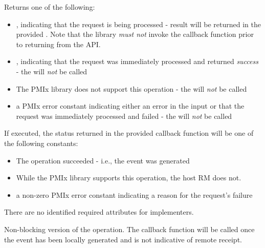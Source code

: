 \begin{arglist}
\end{arglist}

Returns one of the following:

\begin{itemize}
    \item {}, indicating that the request is being processed - result will be returned in the provided . Note that the library \emph{must not} invoke the callback function prior to returning from the \ac{API}.
    \item {}, indicating that the request was immediately processed and returned \textit{success} - the  will \textit{not} be called
    \item {} The \ac{PMIx} library does not support this operation - the  will \textit{not} be called
    \item a PMIx error constant indicating either an error in the input or that the request was immediately processed and failed - the  will \textit{not} be called
\end{itemize}

If executed, the status returned in the provided callback function will be one of the following constants:

\begin{itemize}
\item {} The operation succeeded - i.e., the  event was generated
\item {} While the \ac{PMIx} library supports this operation, the host \ac{RM} does not.
\item a non-zero \ac{PMIx} error constant indicating a reason for the request's failure
\end{itemize}


\reqattrstart
There are no identified required attributes for implementers.

\reqattrend

\descr

Non-blocking version of the  operation. The callback function will be called once the event has been locally generated and is not indicative of remote receipt.


